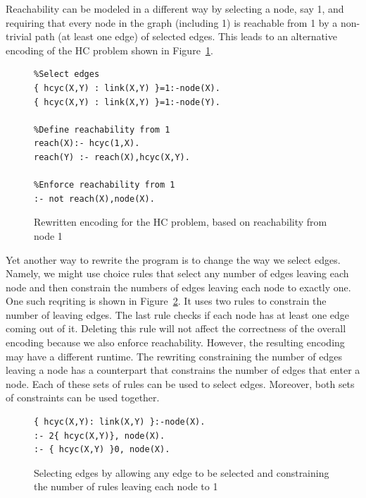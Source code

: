 \documentclass{new_tlp}
\begin{document}
Reachability can be modeled in a different way by selecting a node, say 1, and
requiring that every node in the graph (including 1) is reachable from 1 by a 
non-trivial path (at least one edge) of selected edges. This leads to an alternative 
encoding of the HC problem shown in Figure~\ref{reachencod2}. 

\begin{figure}
\figrule
\begin{center}
\begin{verbatim}
%Select edges
{ hcyc(X,Y) : link(X,Y) }=1:-node(X).
{ hcyc(X,Y) : link(X,Y) }=1:-node(Y).

%Define reachability from 1
reach(X):- hcyc(1,X).
reach(Y) :- reach(X),hcyc(X,Y).

%Enforce reachability from 1
:- not reach(X),node(X).
\end{verbatim}
\end{center}
\caption{Rewritten encoding for the HC problem, based on reachability from
node 1}\label{reachencod2}
\figrule
\end{figure}

Yet another way to rewrite the program is to change the way we select edges.
Namely, we might use choice rules that select any number of edges leaving each 
node and then constrain the numbers of edges leaving each node to exactly one.
One such reqriting is shown in Figure~\ref{breakrule}. It uses two rules to 
constrain the number of leaving edges. The last rule checks if each node has 
at least one edge coming out of it. Deleting this rule will not affect the 
correctness of the overall encoding because we also enforce reachability. 
However, the resulting encoding may have a different runtime. The rewriting 
constraining the number of edges leaving a node has a counterpart that 
constrains the number of edges that enter a node. Each of these sets of
rules can be used to select edges. Moreover, both sets of constraints can 
be used together. 

\begin{figure}
\figrule
\begin{center}
\begin{verbatim}
{ hcyc(X,Y): link(X,Y) }:-node(X).
:- 2{ hcyc(X,Y)}, node(X).
:- { hcyc(X,Y) }0, node(X).
\end{verbatim}
\end{center}
\caption{Selecting edges by allowing any edge to be selected and constraining
the number of rules leaving each node  to 1}\label{breakrule}
\figrule
\end{figure}
\end{document}
